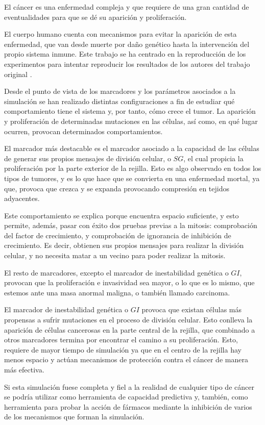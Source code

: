 El cáncer es una enfermedad compleja y que requiere de una gran cantidad
de eventualidades para que se dé su aparición y proliferación.

El cuerpo humano cuenta con mecanismos para evitar la aparición de esta enfermedad,
que van desde muerte por daño genético hasta la intervención del propio sistema inmune.
Este trabajo se ha centrado en la reproducción de los experimentos para intentar reproducir
los resultados de los autores del trabajo original \cite{jsantos-amonteagudo-1-2014}.

Desde el punto de vista de los marcadores y los parámetros asociados a la simulación se
han realizado distintas configuraciones a fin de estudiar qué comportamiento tiene el sistema y, por tanto,
cómo crece el tumor. La aparición y proliferación de determinadas mutaciones en las células, así como, en qué lugar ocurren,
provocan determinados comportamientos.

El marcador más destacable es el marcador asociado a la capacidad de las células de generar sus propios mensajes de división celular,
o $SG$, el cual propicia la proliferación por la parte exterior de la rejilla.
Esto es algo observado en todos los tipos de tumores, y es lo que hace que se convierta en una
enfermedad mortal, ya que, provoca que crezca y se expanda provocando compresión en tejidos
adyacentes.

Este comportamiento se explica porque encuentra espacio suficiente, y esto permite, además, pasar con éxito dos pruebas previas a la mitosis:
comprobación del factor de crecimiento, y comprobación de ignorancia de inhibición de crecimiento.
Es decir, obtienen sus propios mensajes para realizar la división celular, y no necesita
matar a un vecino para poder realizar la mitosis.

El resto de marcadores, excepto el marcador de inestabilidad genética o $GI$, provocan
que la proliferación e invasividad sea mayor, o lo que es lo mismo, que estemos ante una
masa anormal maligna, o también llamado carcinoma.

El marcador de inestabilidad genética o $GI$ provoca que existan células más propensas
a sufrir mutaciones en el proceso de división celular. Esto conlleva la aparición
de células cancerosas en la parte central de la rejilla, que combinado a otros marcadores
termina por encontrar el camino a su proliferación. Esto, requiere de mayor tiempo de simulación
ya que en el centro de la rejilla hay menos espacio y actúan mecanismos de protección contra
el cáncer de manera más efectiva.

Si esta simulación fuese completa y fiel a la realidad de cualquier tipo de cáncer se
podría utilizar como herramienta de capacidad predictiva y, también, como herramienta
para probar la acción de fármacos mediante la inhibición de varios de los mecanismos
que forman la simulación.
